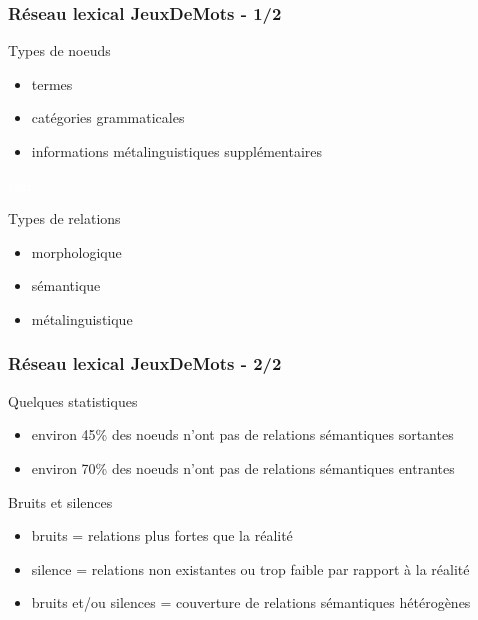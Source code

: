 \documentclass{beamer}
\begin{document}
\begin{frame}
\frametitle{Réseau lexical JeuxDeMots - 1/2}

\begin{block}{Types de noeuds}
  \begin{itemize}
  \item termes
  \item catégories grammaticales
  \item informations métalinguistiques supplémentaires 
  \end{itemize}
\end{block}

  \textcolor{white}{text}\\
  \begin{block}{Types de relations} 
  \begin{itemize}
  \item morphologique
  \item sémantique
  \item métalinguistique
  \end{itemize}
  \end{block}
\end{frame}

\begin{frame}
\frametitle{Réseau lexical JeuxDeMots - 2/2}
  \begin{block}{Quelques statistiques}
  \begin{itemize}
  \item environ 45\% des noeuds n'ont pas de relations sémantiques sortantes
  \item environ 70\% des noeuds n'ont pas de relations sémantiques entrantes
  \end{itemize}
  \end{block}
\end{frame}

\begin{frame}
  \begin{block}{Bruits et silences}
  \begin{itemize}
  \item bruits = relations plus fortes que la réalité 
  \item silence = relations non existantes ou trop faible par rapport à la réalité 
  \item bruits et/ou silences = couverture de relations sémantiques hétérogènes
  \end{itemize}
  \end{block}
\end{frame}
\end{document}
